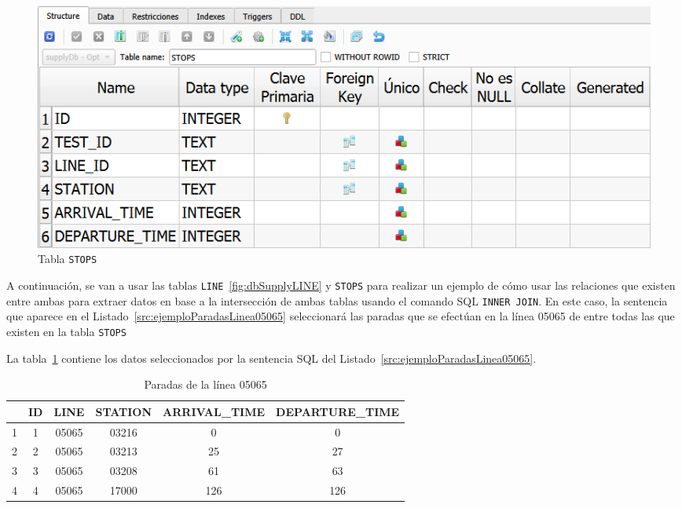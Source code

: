 \begin{figure}[H]
\centering
\includegraphics[width=.9\textwidth]{fig/Tablas base de datos/Oferta/STOPS.png}
\caption{Tabla \texttt{STOPS}}
\label{fig:dbSupplySTOPS}
\end{figure}

A continuación, se van a usar las tablas \texttt{LINE}~\ref{fig:dbSupplyLINE} y \texttt{STOPS} para realizar un ejemplo de cómo usar las relaciones que existen entre ambas para extraer datos en base a la intersección de ambas tablas usando el comando \acrshort{SQL} \texttt{INNER JOIN}. En este caso, la sentencia que aparece en el Listado~\ref{src:ejemploParadasLinea05065} seleccionará las paradas que se efectúan en la línea 05065 de entre todas las que existen en la tabla \texttt{STOPS}



La tabla~\ref{tab:ejemploParadasLinea05065} contiene los datos seleccionados por la sentencia \acrshort{SQL} del Listado~\ref{src:ejemploParadasLinea05065}.

\begin{table}[H]
\centering
\begin{tabular}{c|c|c|c|c|c|}
\cline{2-6}
 & \cellcolor[HTML]{C0C0C0}ID
 & \cellcolor[HTML]{C0C0C0}LINE
 & \cellcolor[HTML]{C0C0C0}STATION
 & \cellcolor[HTML]{C0C0C0}ARRIVAL\_TIME
 & \cellcolor[HTML]{C0C0C0}DEPARTURE\_TIME \\ \hline
\multicolumn{1}{|l|}{1} & 1 & 05065 & 03216 & 0   & 0   \\ \hline
\multicolumn{1}{|l|}{2} & 2 & 05065 & 03213 & 25  & 27  \\ \hline
\multicolumn{1}{|l|}{3} & 3 & 05065 & 03208 & 61  & 63  \\ \hline
\multicolumn{1}{|l|}{4} & 4 & 05065 & 17000 & 126 & 126 \\ \hline
\end{tabular}
\caption{Paradas de la línea 05065}
\label{tab:ejemploParadasLinea05065}
\end{table}


